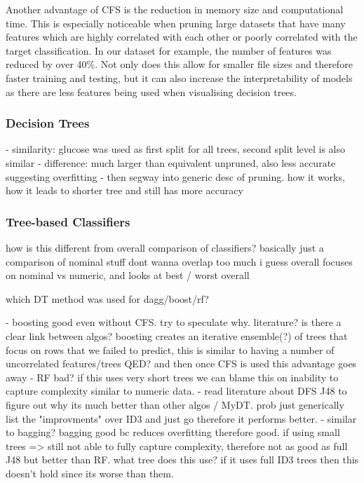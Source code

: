 Another advantage of CFS is the reduction in memory size and computational time. This is especially noticeable when pruning large datasets that have many features which are highly correlated with each other  or poorly correlated with the target classification. In our dataset for example, the number of features was reduced by over 40\%. Not only does this allow for smaller file sizes and therefore faster training and testing, but it can also increase the interpretability of models as there are less features being used when visualising decision trees.

\subsubsection{Decision Trees}





- similarity: glucose was used as first split for all trees, second split level is also similar
- difference: much larger than equivalent unpruned, also less accurate suggesting overfitting
- then segway into generic desc of pruning. how it works, how it leads to shorter tree and still has more accuracy



\subsubsection{Tree-based Classifiers}


how is this different from overall comparison of classifiers? basically just a comparison of nominal stuff
dont wanna overlap too much
i guess overall focuses on nominal vs numeric, and looks at best / worst overall

which DT method was used for dagg/boost/rf?


- boosting good even without CFS. try to speculate why. literature? is there a clear link between algos? boosting creates an iterative ensemble(?) of trees that focus on rows that we failed to predict, this is similar to having a number of uncorrelated features/trees QED? and then once CFS is used this advantage goes away
- RF bad? if this uses very short trees we can blame this on inability to capture complexity similar to numeric data.
- read literature about DFS J48 to figure out why its much better than other algos / MyDT. prob just generically list the "improvments" over ID3 and just go therefore it performs better.
- similar to bagging? bagging good bc reduces overfitting therefore good. if using small trees => still not able to fully capture complexity, therefore not as good as full J48 but better than RF. what tree does this use? if it uses full ID3 trees then this doesn't hold since its worse than them.


